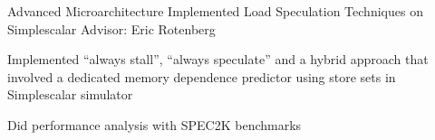 \begin{cventries}
  \cventry
    {Advanced Microarchitecture}
    {Implemented Load Speculation Techniques on Simplescalar}
    {Advisor: Eric Rotenberg}
    {}
    {
     \begin{cvitems} %
        \item {Implemented “always stall”, “always speculate” and a hybrid approach that involved a dedicated memory dependence predictor using store sets in Simplescalar simulator}
        \item {Did performance analysis with SPEC2K benchmarks}
      \end{cvitems}
    }
    
\end{cventries}


